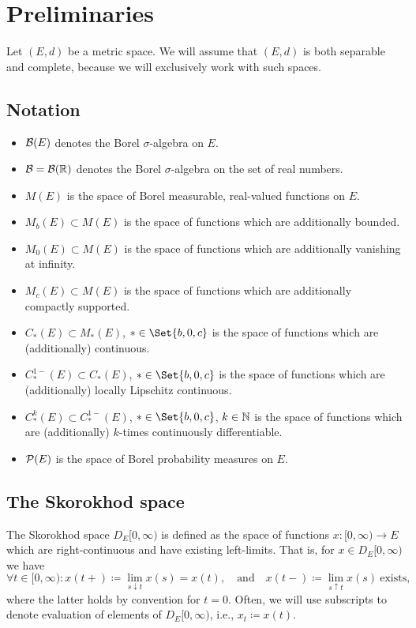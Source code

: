 \section{Preliminaries}

Let \((E,d)\) be a metric space.
We will assume that \((E,d)\) is both separable and complete, because we will exclusively work with such spaces.

\subsection{Notation}
\begin{itemize}
  \item \(\mathcal{B}(E)\) denotes the Borel \( \sigma \)-algebra on \(E\).
  \item \( \mathcal{B} = \mathcal{B}(\mathbb{R}) \) denotes the Borel \( \sigma \)-algebra on the set of real numbers.
  \item \(M(E)\) is the space of Borel measurable, real-valued functions on \(E\).
  \item \(M_b(E) \subset M(E)\) is the space of functions which are additionally bounded.
  \item \(M_0(E) \subset M(E)\) is the space of functions which are additionally vanishing at infinity.
  \item \(M_c(E) \subset M(E)\) is the space of functions which are additionally compactly supported.
  \item \(C_*(E) \subset M_*(E)\), \( * \in \Set{b, 0, c} \) is the space of functions which are (additionally) continuous.
  \item \(C_*^{1-}(E) \subset C_*(E)\), \( * \in \Set{b, 0, c} \) is the space of functions which are (additionally) locally Lipschitz continuous.
  \item \(C_*^{k}(E) \subset C_*^{1-}(E)\), \( * \in \Set{b, 0, c} \), \( k \in \mathbb{N} \) is the space of functions which are (additionally) \(k\)-times continuously differentiable.
  \item \(\mathcal{P}(E)\) is the space of Borel probability measures on \(E\).
\end{itemize}

\subsection{The Skorokhod space}%
The Skorokhod space \(D_E[0,\infty)\) is defined as the space of functions \(x : [0,\infty) \to E\) which are right-continuous and have existing left-limits.
That is, for \(x \in D_E[0,\infty)\) we have
\begin{equation}
  \forall t \in [0,\infty) : x(t+) \coloneqq \lim_{s \downarrow t} x(s) = x(t), \quad\text{and}\quad x(t-) \coloneqq \lim_{s \uparrow t} x(s)\ \text{exists},
\end{equation}
where the latter holds by convention for \(t = 0\).
Often, we will use subscripts to denote evaluation of elements of \(D_E[0,\infty)\), i.e., \(x_t \coloneqq x(t)\).

